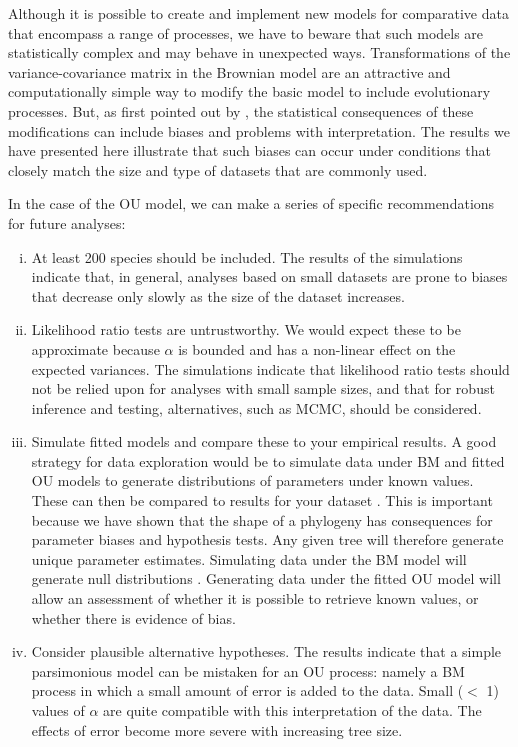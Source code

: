 \documentclass[a4paper,12pt]{article}
\begin{document}
Although it is possible to create and implement new models for comparative data that encompass a range of processes, we have to beware that such models are statistically complex and may behave in unexpected ways. Transformations of the variance-covariance matrix in the Brownian model are an attractive and computationally simple way to modify the basic model to include evolutionary processes. But, as first pointed out by \citet{grafen1989phylogenetic}, the statistical consequences of these modifications can include biases and problems with interpretation. The results we have presented here illustrate that such biases can occur under conditions that closely match the size and type of datasets that are commonly used. 

In the case of the OU model, we can make a series of specific recommendations for future analyses:
\begin{enumerate}[(i)]
  \item At least 200 species should be included. The results of the simulations indicate that, in general, analyses based on small datasets are prone to biases that decrease only slowly as the size of the dataset increases.  
  \item Likelihood ratio tests are untrustworthy. We would expect these to be approximate because $\alpha$ is bounded and has a non-linear effect on the expected variances. The simulations indicate that likelihood ratio tests should not be relied upon for analyses with small sample sizes, and that for robust inference and testing, alternatives, such as MCMC, should be considered. 
  \item Simulate fitted models and compare these to your empirical results. A good strategy for data exploration would be to simulate data under BM and fitted OU models to generate distributions of parameters under known values. These can then be compared to results for your dataset \citep[see][for a related approach]{slater2013robust}. This is important because we have shown that the shape of a phylogeny has consequences for parameter biases and hypothesis tests. Any given tree will therefore generate unique parameter estimates. Simulating data under the BM model will generate null distributions \citep[e.g.,][]{boettiger2012your}. Generating data under the fitted OU model will allow an assessment of whether it is possible to retrieve known values, or whether there is evidence of bias. 
  \item Consider plausible alternative hypotheses. The results indicate that a simple parsimonious model can be mistaken for an OU process: namely a BM process in which a small amount of error is added to the data. Small ($<$ 1) values of $\alpha$ are quite compatible with this interpretation of the data. The effects of error become more severe with increasing tree size. 
\end{enumerate}
\end{document}
